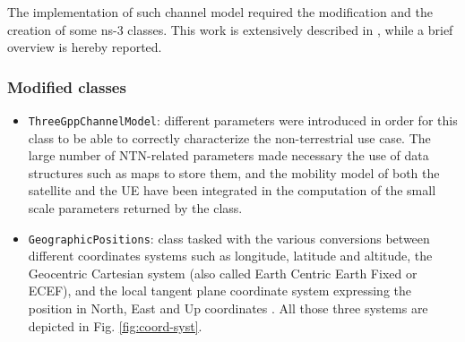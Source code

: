 The implementation of such channel model required the modification and the creation of some ns-3 classes. This work is extensively described in \cite{Sandri_2023}, while a brief overview is hereby reported.

\subsubsection{Modified classes}
\begin{itemize}
    \item \texttt{ThreeGppChannelModel}: different parameters were introduced in order for this class to be able to correctly characterize the non-terrestrial use case. The large number of \ac{NTN}-related parameters made necessary the use of data structures such as maps to store them, and the mobility model of both the satellite and the \ac{UE} have been integrated in the computation of the small scale parameters returned by the class.
    \item \texttt{GeographicPositions}: class tasked with the various conversions between different coordinates systems such as longitude, latitude and altitude, the Geocentric Cartesian system (also called Earth Centric Earth Fixed or ECEF), and the local tangent plane coordinate system expressing the position in North, East and Up coordinates \cite{wiki_coords}. All those three systems are depicted in Fig. \ref{fig:coord-syst}.
\end{itemize}
